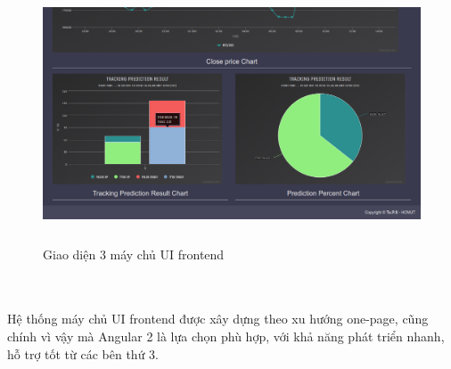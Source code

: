 \begin{figure}[h!]
\centering
\includegraphics[height=3in, keepaspectratio=true]{3.png}
\caption{Giao diện 3 máy chủ UI frontend}
\end{figure}\\\\
Hệ thống máy chủ UI frontend được xây dựng theo xu hướng one-page, cũng chính 
vì vậy mà Angular 2 là lựa chọn phù hợp, với khả năng phát triển nhanh, hỗ trợ 
tốt từ các bên thứ 3.